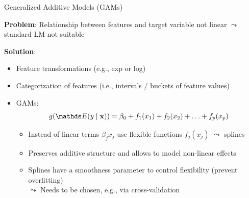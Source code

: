 \documentclass[11pt,compress,t,notes=noshow, aspectratio=169, xcolor=table]{beamer}
\begin{document}

\begin{frame}{Generalized Additive Models (GAMs) }

\textbf{Problem}: Relationship between features and target variable not linear $\leadsto$ standard LM not suitable 

\medskip
\pause
\textbf{Solution}: 
 \begin{itemize}
        \item Feature transformations (e.g., exp or log)
        \item Categorization of features (i.e., intervals / buckets of feature values)
        \item GAMs:
        $$g(\E (y \mid \xv)) = \beta_0 + f_1(x_1) + f_2(x_2) + \ldots + f_p(x_p)$$
    
    \begin{itemize}
        \item Instead of linear terms $\beta_j x_j$ use flexible functions $f_j(x_j)$ $\leadsto$ splines
        \item Preserves additive structure and allows to model non-linear effects
        \item Splines have a smoothness parameter to control flexibility (prevent overfitting)\\
        $\leadsto$ Needs to be chosen, e.g., via cross-validation
    \end{itemize}
    \end{itemize}
    
    

   

\end{frame}
\end{document}
